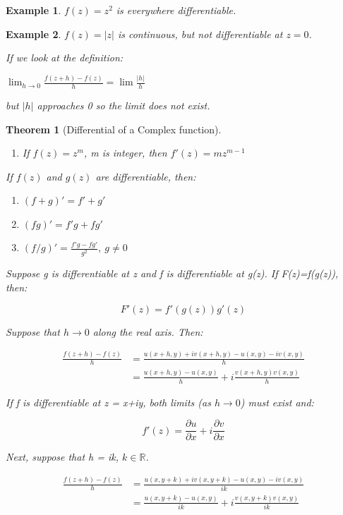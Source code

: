 \documentclass{article}
\newtheorem{theorem}{Theorem}[section]
\newtheorem{ex}{Example}
\theoremstyle{definition}
\def\R{\mathbb{R}}
\begin{document}
\begin{ex}
$f(z) = z^2$ is everywhere differentiable. 
\end{ex}

\begin{ex}
	$f(z) = |z|$ is continuous, but not differentiable at $z = 0$. 
	
	If we look at the definition:
	
	$\lim_{h\to0} \frac{f(z+h) - f(z)}{h} = \lim \frac{|h|}{h}$
	
	but $|h|$ approaches 0 so the limit does not exist.
\end{ex}



\begin{theorem}[Differential of a Complex function]
\begin{enumerate}
	\item If $f(z) = z^m$, m is integer, then $f'(z) = mz^{m-1}$
\end{enumerate}
If $f(z)$ and $g(z)$ are differentiable, then:
\begin{enumerate}
	\item$(f+g)' = f'+g'$
	\item$(fg)' = f'g + fg'$
	\item$(f/g)' = \frac{f'g-fg'}{g^2},\ g \neq 0 $
\end{enumerate}


Suppose g is differentiable at z and f is differentiable at g(z). If F(z)=f(g(z)), then:

$$ F'(z) = f'(g(z))g'(z)$$

Suppose that $h \to 0$ along the real axis. Then:

\begin{align*}
\frac{f(z+h) - f(z)}{h} & = \frac{u(x+h, y) + iv(x+h,y) - u(x,y) - iv(x,y)}{h}\\
& = \frac{u(x+h, y) - u(x,y) }{h} + i \frac{v(x+h,y) v(x,y)}{h}
\end{align*}

If f is differentiable at z = x+iy, both limits (as $h \to 0$) must exist and:

$$f'(z) = \frac{\partial u}{\partial x} + i  \frac{\partial v}{\partial x}$$

Next, suppose that h = ik, $k \in \R$.

\begin{align*}
\frac{f(z+h) - f(z)}{h} & = \frac{u(x, y+k) + iv(x,y+k) - u(x,y) - iv(x,y)}{ik}\\
& = \frac{u(x, y+k) - u(x,y) }{ik} + i \frac{v(x,y+k) v(x,y)}{ik}
\end{align*}


\end{theorem}
\end{document}
